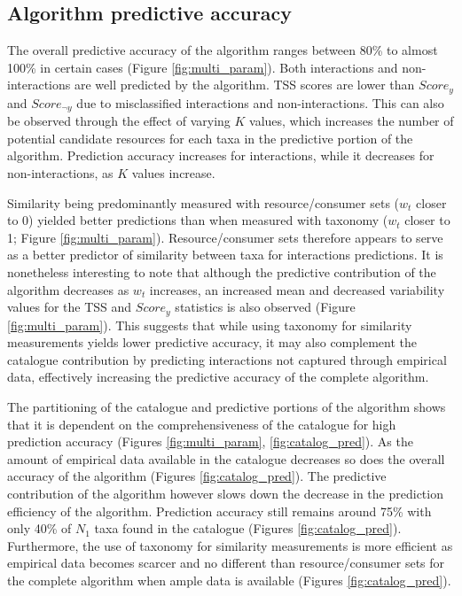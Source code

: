 \documentclass[letterpaper]{article}
\begin{document}
    \subsection{Algorithm predictive accuracy}
The overall predictive accuracy of the algorithm ranges between 80\% to almost 100\% in certain cases (Figure \ref{fig:multi_param}). Both interactions and non-interactions are well predicted by the algorithm. TSS scores are lower than $Score_y$ and $Score_{\neg y}$ due to misclassified interactions and non-interactions. This can also be observed through the effect of varying $K$ values, which increases the number of potential candidate resources for each taxa in the predictive portion of the algorithm. Prediction accuracy increases for interactions, while it decreases for non-interactions, as $K$ values increase.

Similarity being predominantly measured with resource/consumer sets ($w_t$ closer to 0) yielded better predictions than when measured with taxonomy ($w_t$ closer to 1; Figure \ref{fig:multi_param}). Resource/consumer sets therefore appears to serve as a better predictor of similarity between taxa for interactions predictions. It is nonetheless interesting to note that although the predictive contribution of the algorithm decreases as $w_t$ increases, an increased mean and decreased variability values for the TSS and $Score_y$ statistics is also observed (Figure \ref{fig:multi_param}). This suggests that while using taxonomy for similarity measurements yields lower predictive accuracy, it may also complement the catalogue contribution by predicting interactions not captured through empirical data, effectively increasing the predictive accuracy of the complete algorithm.

The partitioning of the catalogue and predictive portions of the algorithm shows that it is dependent on the comprehensiveness of the catalogue for high prediction accuracy (Figures \ref{fig:multi_param}, \ref{fig:catalog_pred}). As the amount of empirical data available in the catalogue decreases so does the overall accuracy of the algorithm (Figures \ref{fig:catalog_pred}). The predictive contribution of the algorithm however slows down the decrease in the prediction efficiency of the algorithm. Prediction accuracy still remains around 75\% with only 40\% of $N_1$ taxa found in the catalogue (Figures \ref{fig:catalog_pred}). Furthermore, the use of taxonomy for similarity measurements is more efficient as empirical data becomes scarcer and no different than resource/consumer sets for the complete algorithm when ample data is available (Figures \ref{fig:catalog_pred}).
\end{document}
